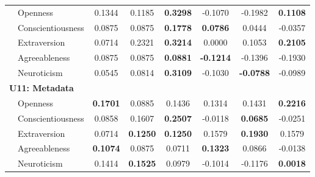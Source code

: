 \begin{longtable}{llcccccc}
& Openness & 0.1344 & 0.1185 & \textbf{0.3298} & -0.1070 & -0.1982 & \textbf{0.1108} \\
& Conscientiousness & 0.0875 & 0.0875 & \textbf{0.1778} & \textbf{0.0786} & 0.0444 & -0.0357 \\
& Extraversion & 0.0714 & 0.2321 & \textbf{0.3214} & 0.0000 & 0.1053 & \textbf{0.2105} \\
& Agreeableness & 0.0875 & 0.0875 & \textbf{0.0881} & \textbf{-0.1214} & -0.1396 & -0.1930 \\
& Neuroticism & 0.0545 & 0.0814 & \textbf{0.3109} & -0.1030 & \textbf{-0.0788} & -0.0989 \\

\hline
\multicolumn{8}{l}{\textbf{U11: Metadata}} \\

& Openness & \textbf{0.1701} & 0.0885 & 0.1436 & 0.1314 & 0.1431 & \textbf{0.2216} \\
& Conscientiousness & 0.0858 & 0.1607 & \textbf{0.2507} & -0.0118 & \textbf{0.0685} & -0.0251 \\
& Extraversion & 0.0714 & \textbf{0.1250} & \textbf{0.1250} & 0.1579 & \textbf{0.1930} & 0.1579 \\
& Agreeableness & \textbf{0.1074} & 0.0875 & 0.0711 & \textbf{0.1323} & 0.0866 & -0.0138 \\
& Neuroticism & 0.1414 & \textbf{0.1525} & 0.0979 & -0.1014 & -0.1176 & \textbf{0.0018} \\

\end{longtable}




\small
\setlength{\tabcolsep}{4pt}

